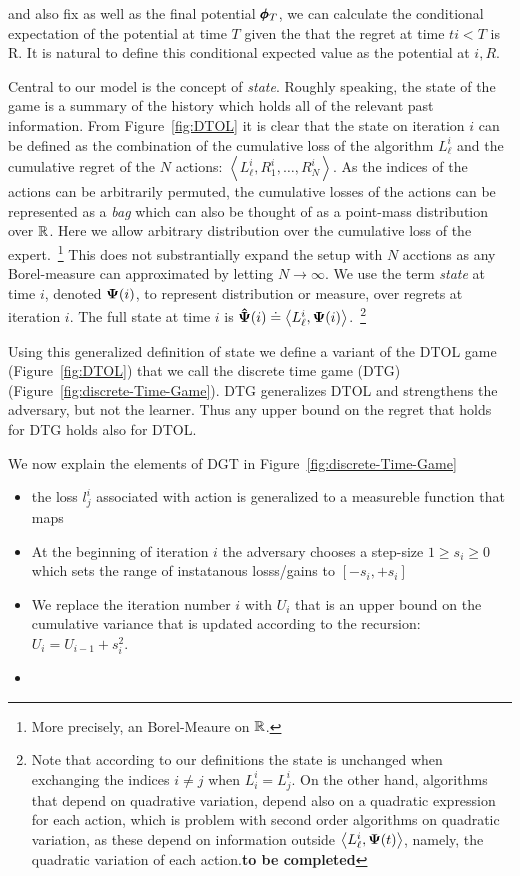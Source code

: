 \documentclass{article}[12pt]
\begin{document}
and also fix as well as
the final potential $\pmb{\phi}_{T}$, we can calculate the conditional
expectation of the potential at time $T$ given the that the regret at
time $ti<T$ is R.  It is natural to define this conditional expected
value as the potential at $i,R$.





Central to our model is the concept of {\em state}. Roughly speaking,
the state of the game is a summary of the history which holds all of
the relevant past information. From Figure~\ref{fig:DTOL} it is clear
that the state on iteration $i$ can be defined as the combination of
the cumulative loss of the algorithm $L_\ell^i$ and the cumulative
regret of the $N$ actions:
$\left\langle L^i_\ell,R_1^i,\ldots,R_N^i \right\rangle$. As the
indices of the actions can be arbitrarily permuted, the cumulative
losses of the actions can be represented as a {\em bag} which can also
be thought of as a point-mass distribution over $\mathbb{R}$. Here we
allow arbitrary distribution over the cumulative loss of the
expert.~\footnote{More precisely, an Borel-Meaure on $\mathbb{R}$.} This
does not substrantially expand the setup with $N$ acctions as any
Borel-measure can approximated by letting $N \to \infty$. We use the
term {\em state} at time $i$, denoted ${\bf \Psi}(i)$, to represent
distribution or measure, over regrets at iteration $i$.  The full
state at time $i$ is
${\bf \hat{\Psi}}(i) \doteq \left\langle L^i_\ell,{\bf \Psi}(i)
\right\rangle$.~\footnote{Note that according to our definitions the
  state is unchanged when exchanging the indices $i \neq j$ when
  $L_i^i=L_j^i$.  On the other hand, algorithms that depend on
  quadrative variation, depend also on a quadratic expression for each
  action, which is problem with second order algorithms on quadratic
  variation, as these depend on information outside
  $\left\langle L^i_\ell,{\bf \Psi}(t) \right\rangle$, namely, the
  quadratic variation of each action.{\bf to be completed}}

Using this generalized definition of state we define a variant of the
DTOL game (Figure~\ref{fig:DTOL}) that we call the discrete time game (DTG)
(Figure~\ref{fig:discrete-Time-Game}). DTG generalizes DTOL and strengthens the adversary,
but not the learner. Thus any upper bound on the regret that holds for DTG holds also for DTOL. 

We now explain the elements of DGT in Figure~\ref{fig:discrete-Time-Game}
\begin{itemize}
\item the loss $l_j^i$ associated with action is generalized to a measureble function that maps 
\item At the beginning of iteration $i$ the adversary chooses a
  step-size $1 \geq s_i \geq 0$ which sets the range of instatanous
  losss/gains to $[-s_i,+s_i]$
\item We replace the iteration number $i$ with $U_i$ that is an upper
  bound on the cumulative variance that is updated according to the recursion:
  $U_i = U_{i-1}+s_i^2$.
\item  
\end{itemize}
\end{document}
